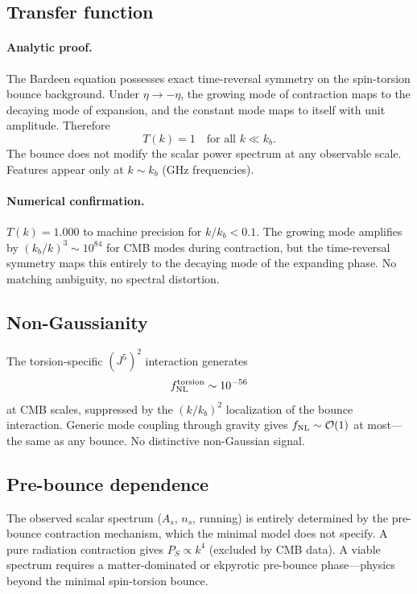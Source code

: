 \documentclass[aps,prd,twocolumn,superscriptaddress,showpacs,preprintnumbers,
  nofootinbib,longbibliography,floatfix]{revtex4-2}
\begin{document}
\subsection{Transfer function}

\paragraph{Analytic proof.}
The Bardeen equation possesses exact time-reversal symmetry on the
spin-torsion bounce background. Under $\eta \to -\eta$, the growing mode
of contraction maps to the decaying mode of expansion, and the constant
mode maps to itself with unit amplitude. Therefore
\begin{equation}\label{eq:transfer}
  \boxed{T(k) = 1 \quad \text{for all } k \ll k_b.}
\end{equation}
The bounce does not modify the scalar power spectrum at any observable
scale. Features appear only at $k \sim k_b$ (GHz frequencies).

\paragraph{Numerical confirmation.}
$T(k) = 1.000$ to machine precision for $k/k_b < 0.1$. The growing mode
amplifies by $(k_b/k)^3 \sim 10^{84}$ for CMB modes during contraction,
but the time-reversal symmetry maps this entirely to the decaying mode
of the expanding phase. No matching ambiguity, no spectral distortion.

\subsection{Non-Gaussianity}

The torsion-specific $(J^5)^2$ interaction generates
\begin{equation}\label{eq:fNL}
  f_{\rm NL}^{\rm torsion} \sim 10^{-56}
\end{equation}
at CMB scales, suppressed by the $(k/k_b)^2$ localization of the bounce
interaction. Generic mode coupling through gravity gives $f_{\rm NL}
\sim \mathcal{O}(1)$ at most---the same as any bounce. No distinctive
non-Gaussian signal.

\subsection{Pre-bounce dependence}

The observed scalar spectrum ($A_s$, $n_s$, running) is entirely
determined by the pre-bounce contraction mechanism, which the minimal
model does not specify. A pure radiation contraction gives
$P_S \propto k^4$ (excluded by CMB data). A viable spectrum requires
a matter-dominated or ekpyrotic pre-bounce phase---physics beyond the
minimal spin-torsion bounce.
\end{document}
